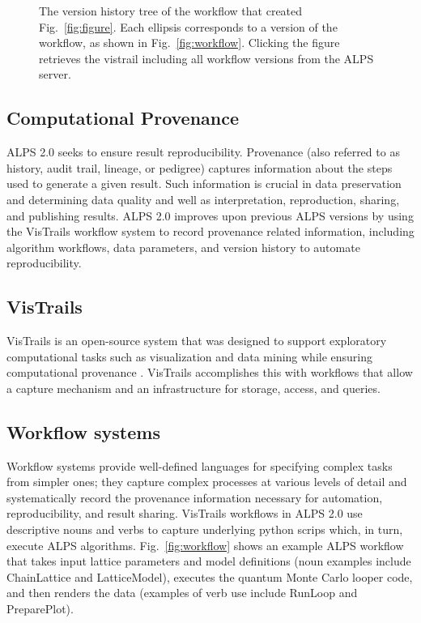 \documentclass[12pt]{iopart}
\begin{document}
\begin{figure}
\begin{center}
\caption{The version history tree of the workflow that created Fig.~\ref{fig:figure}. Each ellipsis corresponds to a version of the workflow, as shown in Fig.~\ref{fig:workflow}. Clicking the figure retrieves the vistrail including all workflow versions from the ALPS server.}
\label{fig:history}
\end{center}
\end{figure}

\subsection{Computational Provenance}

ALPS 2.0 seeks to ensure result reproducibility.  Provenance (also referred to as history, audit trail, lineage, or pedigree) captures information about the steps used to generate a given result.  Such information is crucial in data preservation and determining data quality and well as interpretation, reproduction, sharing, and publishing results.  ALPS 2.0 improves upon previous ALPS versions by using the VisTrails workflow system to record provenance related information, including algorithm workflows, data parameters, and version history to automate reproducibility. 

\subsection{VisTrails} 
VisTrails is an open-source system that was designed to support exploratory computational tasks such as visualization and data mining while ensuring computational provenance \cite{vistrails}.  VisTrails accomplishes this with workflows that allow a capture mechanism and an infrastructure for storage, access, and queries.

\subsection{Workflow systems}
Workflow systems provide well-defined languages for specifying complex tasks from simpler ones; they capture complex processes at various levels of detail and systematically record the provenance information necessary for automation, reproducibility, and result sharing.  VisTrails workflows in ALPS 2.0 use descriptive nouns and verbs to capture underlying python scrips which, in turn, execute ALPS algorithms.  Fig.~\ref{fig:workflow} shows an example ALPS workflow that takes input lattice parameters and model definitions (noun examples include ChainLattice and LatticeModel), executes the quantum Monte Carlo looper code, and then renders the data (examples of verb use include RunLoop and PreparePlot).
\end{document}

